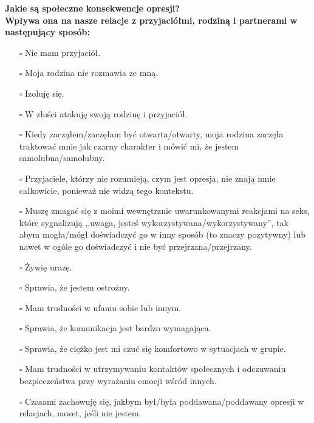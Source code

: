 \noindent\textcolor{ProcessBlue}{\textbf{\Large{Jakie są społeczne konsekwencje opresji?}}}\\
\textbf{\large{Wpływa ona na nasze relacje z przyjaciółmi, rodziną i partnerami w następujący sposób:}}
\begin{multicols}{2}
\begin{itemize}
\item[$\square$]{Nie mam przyjaciół.}
\item[$\square$]{Moja rodzina nie rozmawia ze mną.}
\item[$\square$]{Izoluję się.}
\item[$\square$]{W złości atakuję swoją rodzinę i przyjaciół.}
\item[$\square$]{Kiedy zacząłem/zaczęłam być otwarta/otwarty, moja rodzina zaczęła traktować mnie jak czarny charakter i mówić mi, że jestem samolubna/samolubny.}
\item[$\square$]{Przyjaciele, którzy nie rozumieją, czym jest opresja, nie znają mnie całkowicie, ponieważ nie widzą tego kontekstu.}
\item[$\square$]{Muszę zmagać się z moimi wewnętrznie uwarunkowanymi reakcjami na seks, które sygnalizują ,,uwaga, jesteś wykorzystywana/wykorzystywany'', tak abym mogła/mógł doświadczyć go w inny sposób (to znaczy pozytywny) lub nawet w ogóle go doświadczyć i nie być przejrzana/przejrzany.}
\item[$\square$]{Żywię urazę.}
\item[$\square$]{Sprawia, że jestem ostrożny.}
\item[$\square$]{Mam trudności w ufaniu sobie lub innym.}
\item[$\square$]{Sprawia, że komunikacja jest bardzo wymagająca.}
\item[$\square$]{Sprawia, że ciężko jest mi czuć się komfortowo w sytuacjach w grupie.}
\item[$\square$]{Mam trudności w utrzymywaniu kontaktów społecznych i odczuwaniu bezpieczeństwa przy wyrażaniu emocji wśród innych.}
\item[$\square$]{Czasami zachowuję się, jakbym był/była poddawana/poddawany opresji w relacjach, nawet, jeśli nie jestem.}
\end{itemize}
\end{multicols}


